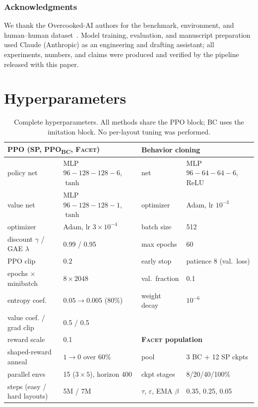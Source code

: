 \documentclass[11pt]{article}
\newcommand{\facet}{\textsc{Facet}}
\newcommand{\ppobc}{PPO\textsubscript{BC}}
\begin{document}
\subsubsection*{Acknowledgments}
We thank the Overcooked-AI authors for the benchmark, environment, and
human--human dataset~\citep{carroll2019utility}. Model training,
evaluation, and manuscript preparation used Claude (Anthropic) as an
engineering and drafting assistant; all experiments, numbers, and claims
were produced and verified by the pipeline released with this paper.




\appendix

\section{Hyperparameters}
\label{app:hparams}

\begin{table}[h]
\centering
\caption{Complete hyperparameters. All methods share the PPO block; BC uses
the imitation block. No per-layout tuning was performed.}
\label{tab:hparams}
\small
\begin{tabular}{llll}
\toprule
\multicolumn{2}{l}{\textbf{PPO (SP, \ppobc{}, \facet{})}} &
\multicolumn{2}{l}{\textbf{Behavior cloning}} \\
\midrule
policy net & MLP $96{-}128{-}128{-}6$, $\tanh$ & net & MLP $96{-}64{-}64{-}6$, ReLU \\
value net & MLP $96{-}128{-}128{-}1$, $\tanh$ & optimizer & Adam, lr $10^{-3}$ \\
optimizer & Adam, lr $3{\times}10^{-4}$ & batch size & 512 \\
discount $\gamma$ / GAE $\lambda$ & 0.99 / 0.95 & max epochs & 60 \\
PPO clip & 0.2 & early stop & patience 8 (val.\ loss) \\
epochs $\times$ minibatch & $8\times2048$ & val.\ fraction & 0.1 \\
entropy coef. & $0.05\!\to\!0.005$ (80\%) & weight decay & $10^{-6}$ \\
value coef. / grad clip & 0.5 / 0.5 & & \\
reward scale & 0.1 & \multicolumn{2}{l}{\textbf{\facet{} population}} \\
shaped-reward anneal & $1\!\to\!0$ over 60\% & pool & 3 BC + 12 SP ckpts \\
parallel envs & 15 ($3\times5$), horizon 400 & ckpt stages & 8/20/40/100\% \\
steps (easy / hard layouts) & 5M / 7M & $\tau$, $\varepsilon$, EMA $\beta$ & 0.35, 0.25, 0.05 \\
\bottomrule
\end{tabular}
\end{table}
\end{document}
